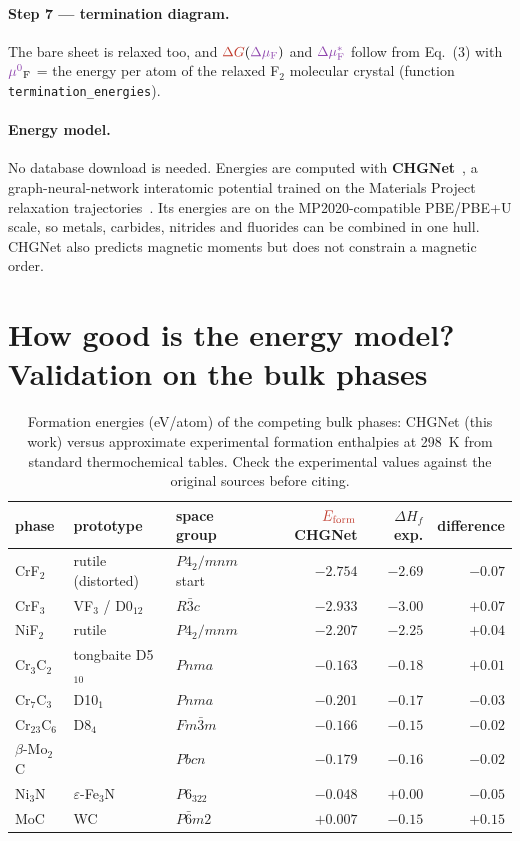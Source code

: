 \documentclass[11pt,a4paper]{article}
\newcommand{\Ef}{\textcolor{ecol}{E_{\mathrm{form}}}}
\newcommand{\dmu}{\textcolor{mucol}{\Delta\mu_{\mathrm F}}}
\newcommand{\dmustar}{\textcolor{mucol}{\Delta\mu_{\mathrm F}^{*}}}
\newcommand{\muzero}{\textcolor{mucol}{\mu^{0}}}
\newcommand{\dG}{\textcolor{ecol}{\Delta G}}
\begin{document}
\paragraph{Step 7 --- termination diagram.} The bare sheet is relaxed too, and $\dG(\dmu)$ and $\dmustar$ follow from Eq.~(3) with
$\muzero_{\mathrm F}$ = the energy per atom of the relaxed F$_2$ molecular crystal (function \texttt{termination\_\allowbreak energies}).

\paragraph{Energy model.} No database download is needed. Energies are computed with \textbf{CHGNet}~\cite{chgnet}, a graph-neural-network
interatomic potential trained on the Materials Project relaxation trajectories~\cite{mp}. Its energies are on the MP2020-compatible PBE/PBE+U
scale, so metals, carbides, nitrides and fluorides can be combined in one hull. CHGNet also predicts magnetic moments but does not
constrain a magnetic order.

\section{How good is the energy model? Validation on the bulk phases}
\label{sec:validation}

\begin{table}[H]
\centering\small
\caption{Formation energies (eV/atom) of the competing bulk phases: CHGNet (this work) versus approximate experimental formation
enthalpies at 298~K from standard thermochemical tables. Check the experimental values against the original sources before citing.}
\label{tab:validation}
\begin{tabular}{@{}lllrrr@{}}
\toprule
phase & prototype & space group & $\Ef$ CHGNet & $\Delta H_f$ exp. & difference\\
\midrule
CrF$_2$ & rutile (distorted) & $P4_2/mnm$ start & $-2.754$ & $-2.69$ & $-0.07$\\
CrF$_3$ & VF$_3$ / D0$_{12}$ & $R\bar3c$ & $-2.933$ & $-3.00$ & $+0.07$\\
NiF$_2$ & rutile & $P4_2/mnm$ & $-2.207$ & $-2.25$ & $+0.04$\\
Cr$_3$C$_2$ & tongbaite D5$_{10}$ & $Pnma$ & $-0.163$ & $-0.18$ & $+0.01$\\
Cr$_7$C$_3$ & D10$_1$ & $Pnma$ & $-0.201$ & $-0.17$ & $-0.03$\\
Cr$_{23}$C$_6$ & D8$_4$ & $Fm\bar3m$ & $-0.166$ & $-0.15$ & $-0.02$\\
$\beta$-Mo$_2$C & & $Pbcn$ & $-0.179$ & $-0.16$ & $-0.02$\\
Ni$_3$N & $\varepsilon$-Fe$_3$N & $P6_322$ & $-0.048$ & $+0.00$ & $-0.05$\\
MoC & WC & $P\bar6m2$ & $+0.007$ & $-0.15$ & $+0.15$\\
\bottomrule
\end{tabular}
\end{table}
\end{document}
